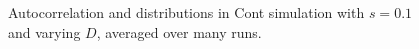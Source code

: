 \documentclass[runningheads]{llncs}
\begin{document}
\begin{figure}[htbp]
\begin{center}
{      
      }
    \caption{Autocorrelation and distributions in Cont simulation with $s=0.1$ and varying $D$, averaged over many runs.}
    \label{fig:ContMultiRun}
  \end{center}
\end{figure}



\end{document}
